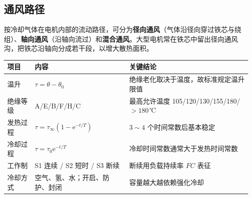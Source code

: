 \subsection{通风路径}
按冷却气体在电机内部的流动路径，可分为\textbf{径向通风}（气体沿径向穿过铁芯与绕组）、\textbf{轴向通风}（沿轴向流过）和\textbf{混合通风}。大型电机常在铁芯中留出径向通风沟，把铁芯沿轴向分成若干段，以增大散热面积。

\begin{center}
\begin{tabular}{@{}p{2.4cm}p{4.2cm}p{5.2cm}@{}}
\toprule
项目 & 内容 & 关键结论 \\
\midrule
温升 & $\tau=\theta-\theta_0$ & 绝缘老化取决于温度，故标准规定温升限值 \\
绝缘等级 & A/E/B/F/H/C & 最高允许温度 105/120/130/155/180/$>180$\,℃ \\
发热过程 & $\tau=\tau_\infty(1-\mathrm{e}^{-t/T})$ & $3\sim4$ 个时间常数后基本稳定 \\
冷却过程 & $\tau=\tau_0\mathrm{e}^{-t/T}$ & 冷却时间常数通常大于发热时间常数 \\
工作制 & S1 连续 / S2 短时 / S3 断续 & 断续用负载持续率 $FC$ 表征 \\
冷却方式 & 空气、氢、水；开启、防护、封闭 & 容量越大越依赖强化冷却 \\
\bottomrule
\end{tabular}
\end{center}
